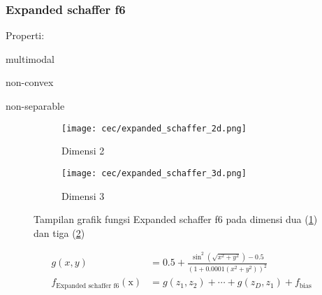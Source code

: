 \subsubsection{Expanded schaffer f6}
\noindent Properti:
\begin{packed_item}
  \item multimodal
  \item non-convex
  \item non-separable
\end{packed_item}
\begin{figure}[H]
	\centering
	\begin{subfigure}[b]{0.4\textwidth}
		\centering
		\texttt{[image: cec/expanded\_schaffer\_2d.png]}
		\caption{Dimensi 2}
		\label{fig:schaffer-2d}
	\end{subfigure}
	\hfill
	\begin{subfigure}[b]{0.4\textwidth}
		\centering
		\texttt{[image: cec/expanded\_schaffer\_3d.png]}
		\caption{Dimensi 3}
		\label{fig:schaffer-3d}
	\end{subfigure}
	\caption{Tampilan grafik fungsi Expanded schaffer f6 pada dimensi dua (\cref{fig:schaffer-2d}) dan tiga (\cref{fig:schaffer-3d})}
	\label{fig:schaffer}
\end{figure}
\begin{equation}
  \begin{split}
    g\left(x,y \right) &= 0.5+\frac{\sin^2\left(\sqrt{x^2+y^2} \right)-0.5 }{\left( 1+0.0001\left(x^2+y^2 \right) \right)^2 }\\
    f_{\text{Expanded schaffer f6}}(\mathrm{x}) &= g\left(z_1,z_2 \right)+\cdots+g\left(z_D,z_1 \right)+f_{\text{bias}}
  \end{split}
\end{equation}

